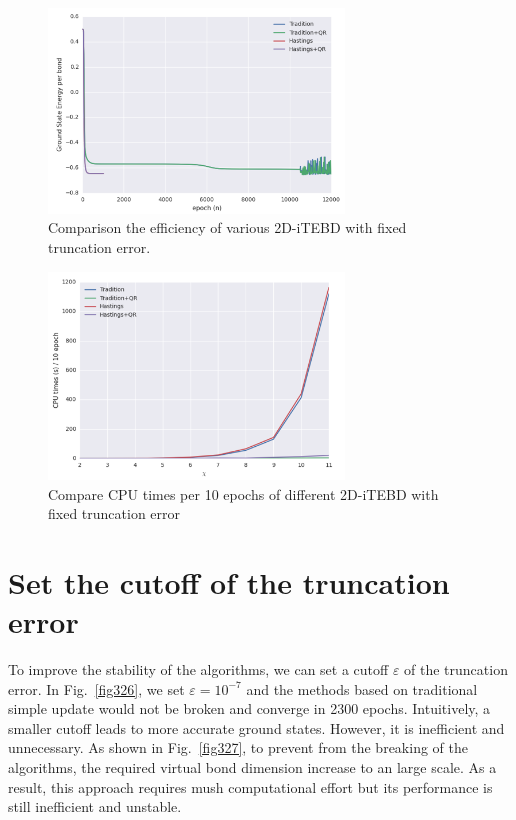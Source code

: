\begin{figure}[ht]
	\centering
	\includegraphics[width=0.70\textwidth]{figures/fig325.png}
	\caption[Comparison the efficiency of various 2D-iTEBD]{Comparison the efficiency of various 2D-iTEBD with fixed truncation error.}
	\label{fig325}
\end{figure}

\begin{figure}[ht]
	\centering
	\includegraphics[width=0.70\textwidth]{figures/fig324.png}
	\caption[Compare CPU times per 10 epochs of different 2D-iTEBD with fixed trucation error]{Compare CPU times per 10 epochs of different 2D-iTEBD with fixed truncation error}
	\label{fig324}
\end{figure}

\section{Set the cutoff of the truncation error}

To improve the stability of the algorithms, we can set a cutoff $\varepsilon$ of the truncation error. In Fig.~\ref{fig326}, we set $\varepsilon = 10^{-7}$ and the methods based on traditional simple update would not be broken and converge in 2300 epochs. Intuitively, a smaller cutoff leads to more accurate ground states. However, it is inefficient and unnecessary. As shown in Fig.~\ref{fig327}, to prevent from the breaking of the algorithms, the required virtual bond dimension increase to an large scale. As a result, this approach requires mush computational effort but its performance is still inefficient and unstable. 

